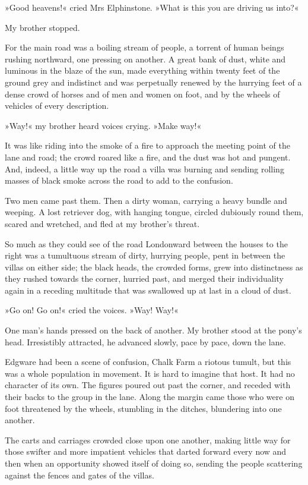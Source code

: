 »Good heavens!« cried Mrs Elphinstone. »What is this you are driving us into?«

My brother stopped.

For the main road was a boiling stream of people, a torrent of human beings rushing northward, one pressing on another. A great bank of dust, white and luminous in the blaze of the sun, made everything within twenty feet of the ground grey and indistinct and was perpetually renewed by the hurrying feet of a dense crowd of horses and of men and women on foot, and by the wheels of vehicles of every description.

»Way!« my brother heard voices crying. »Make way!«

It was like riding into the smoke of a fire to approach the meeting point of the lane and road; the crowd roared like a fire, and the dust was hot and pungent. And, indeed, a little way up the road a villa was burning and sending rolling masses of black smoke across the road to add to the confusion.

Two men came past them. Then a dirty woman, carrying a heavy bundle and weeping. A lost retriever dog, with hanging tongue, circled dubiously round them, scared and wretched, and fled at my brother's threat.

So much as they could see of the road Londonward between the houses to the right was a tumultuous stream of dirty, hurrying people, pent in between the villas on either side; the black heads, the crowded forms, grew into distinctness as they rushed towards the corner, hurried past, and merged their individuality again in a receding multitude that was swallowed up at last in a cloud of dust.

»Go on! Go on!« cried the voices. »Way! Way!«

One man's hands pressed on the back of another. My brother stood at the pony's head. Irresistibly attracted, he advanced slowly, pace by pace, down the lane.

Edgware had been a scene of confusion, Chalk Farm a riotous tumult, but this was a whole population in movement. It is hard to imagine that host. It had no character of its own. The figures poured out past the corner, and receded with their backs to the group in the lane. Along the margin came those who were on foot threatened by the wheels, stumbling in the ditches, blundering into one another.

The carts and carriages crowded close upon one another, making little way for those swifter and more impatient vehicles that darted forward every now and then when an opportunity showed itself of doing so, sending the people scattering against the fences and gates of the villas.

